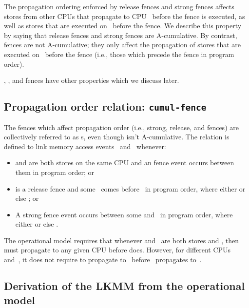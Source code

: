 The propagation ordering enforced by release fences and strong fences
affects stores from other CPUs that propagate to CPU~ before the
fence is executed, as well as stores that are executed on~ before the
fence.
We describe this property by saying that release fences and
strong fences are A-cumulative.
By contrast,  fences are not A-cumulative; they only
affect the propagation of stores that are executed on~ before
the fence (i.e., those which precede the fence in program order).

, , and 
fences have other properties which we discuss later.


\subsection{Propagation order relation: \texttt{cumul-fence}}
\label{sec:docs:explanation:Propagation Order Releation: cumul-fence}

The fences which affect propagation order (i.e., strong, release, and
 fences) are collectively referred to as s, even
though  isn't A-cumulative.
The  relation is defined to link memory access events~
and~ whenever:

\begin{itemize}
\item	{} and  are both stores on the same CPU and an  fence
	event occurs between them in program order; or

\item	{} is a release fence and some ~comes before~ in program order,
	where either  or else ; or

\item	A strong fence event occurs between some  and~ in program
	order, where either  or else .
\end{itemize}

The operational model requires that whenever  and~ are both stores
and , then  must propagate to any given CPU
before  does.
However, for different CPUs~ and~, it does not
require  to propagate to~ before~ propagates to~.


\subsection{Derivation of the LKMM from the operational model}
\label{sec:docs:explanation:Derivation of The LKMM from The Operational Model}

